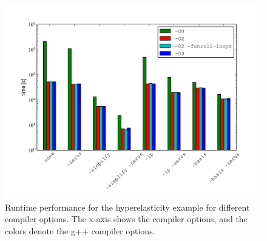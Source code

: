 \begin{figure}
  \center\includegraphics[width=\largefig]{chapters/oelgaard-2/pdf/runtime_hyperelasticity.pdf}
  \caption{Runtime performance for the hyperelasticity example for
    different compiler options.  The x-axis shows the \ffc{} compiler
    options, and the colors denote the g++ compiler options.}
  \label{oelgaard-2:fig:hyper_stats_2}
\end{figure}

